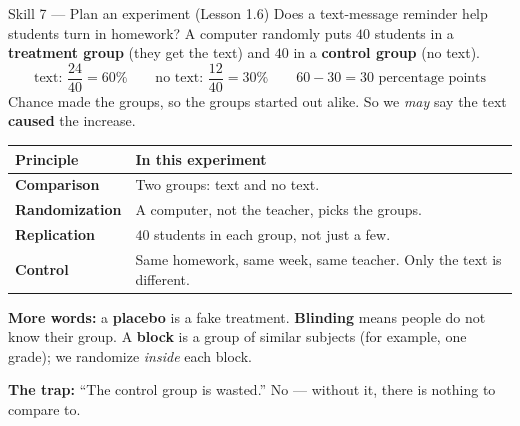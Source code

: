 \documentclass[10pt]{article}
\begin{document}
\vspace{3pt}
\boxguard[18]
\begin{notesbox}{Skill 7 --- Plan an experiment (Lesson 1.6)}
\small
Does a text-message reminder help students turn in homework? A computer randomly puts $40$
students in a \textbf{treatment group} (they get the text) and $40$ in a \textbf{control
group} (no text).
\[ \text{text: } \frac{24}{40} = 60\% \qquad \text{no text: } \frac{12}{40} = 30\% \qquad
   60 - 30 = 30 \text{ percentage points} \]
Chance made the groups, so the groups started out alike. So we \emph{may} say the text
\textbf{caused} the increase.

\vspace{2pt}
\renewcommand{\arraystretch}{1.15}
\begin{tabularx}{\linewidth}{@{} >{\bfseries}p{2.6cm} X @{}}
\rowcolor{frost}
\textbf{Principle} & \textbf{In this experiment} \\
\midrule
Comparison & Two groups: text and no text. \\
Randomization & A computer, not the teacher, picks the groups. \\
Replication & $40$ students in each group, not just a few. \\
Control & Same homework, same week, same teacher. Only the text is different. \\
\end{tabularx}

\vspace{3pt}
\textbf{More words:} a \textbf{placebo} is a fake treatment. \textbf{Blinding} means people
do not know their group. A \textbf{block} is a group of similar subjects (for example, one
grade); we randomize \emph{inside} each block.

\vspace{2pt}
\textbf{The trap:} ``The control group is wasted.'' No --- without it, there is nothing to
compare to.
\end{notesbox}
\end{document}
